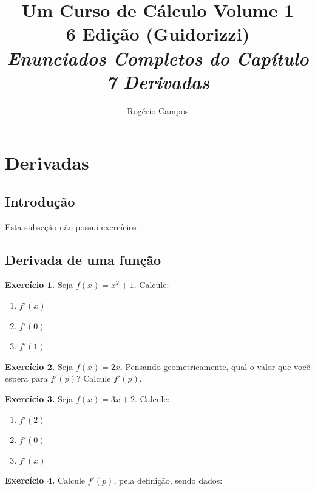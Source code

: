 \documentclass[12pt,a4paper]{article}
\title{
    \Huge \textbf{Um Curso de Cálculo Volume 1} \\
    \vspace{0.3cm}
    \Large 6\textordfeminine{} Edição (Guidorizzi) \\
    \vspace{0.5cm}
    \large \textit{Enunciados Completos do Capítulo 7 Derivadas}
}
\author{Rogério Campos}
\begin{document}
\maketitle
\newpage

\tableofcontents
\newpage

\setcounter{section}{6}
\setcounter{subsection}{1}

\section{Derivadas}

\subsection{Introdução}
Esta subseção não possui exercícios

\subsection{Derivada de uma função}
\vspace{0.5cm}
\noindent\textbf{Exercício 1.} Seja $f(x) = x^2 + 1$. Calcule:

\begin{enumerate}
    \renewcommand{\theenumi}{\alph{enumi}}
    \renewcommand{\labelenumi}{\theenumi)}
    \item $f'(x)$
    \item $f'(0)$
    \item $f'(1)$
\end{enumerate}

\vspace{0.5cm}
\noindent\textbf{Exercício 2.} Seja $f(x) = 2x$. Pensando geometricamente, qual o valor que você espera para $f'(p)$? Calcule $f'(p)$.

\vspace{0.5cm}
\noindent\textbf{Exercício 3.} Seja $f(x) = 3x + 2$. Calcule:

\begin{enumerate}
    \renewcommand{\theenumi}{\alph{enumi}}
    \renewcommand{\labelenumi}{\theenumi)}
    \item $f'(2)$
    \item $f'(0)$
    \item $f'(x)$
\end{enumerate}

\vspace{0.5cm}
\noindent\textbf{Exercício 4.} Calcule $f'(p)$, pela definição, sendo dados:
\end{document}

